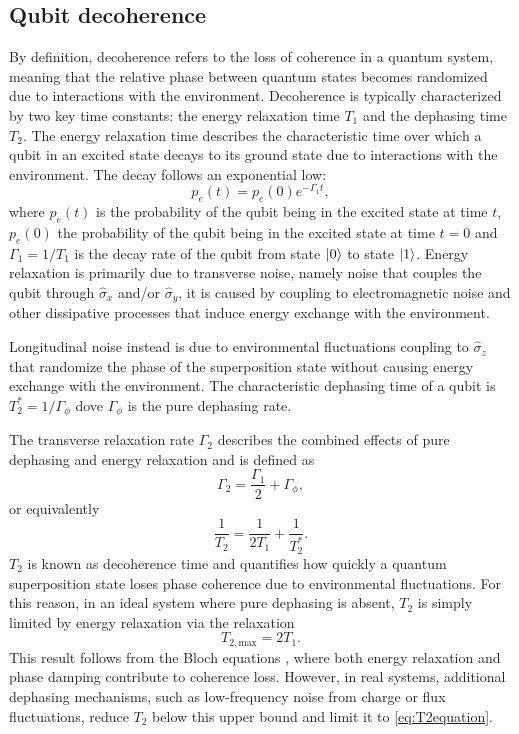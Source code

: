 \subsection{Qubit decoherence}\label{subsec:qubit_decoherence}
By definition, decoherence refers to the loss of coherence in a quantum system, meaning that the relative phase between quantum states becomes randomized due to interactions with the environment. 
Decoherence is typically characterized by two key time constants: the energy relaxation time $T_1$ and the dephasing time $T_2$. 
The energy relaxation time describes the characteristic time over which a qubit in an excited state decays to its ground state due to interactions with the environment. The decay follows an exponential low:
\begin{equation}\label{eq:gamma1}
    p_e(t) = p_e(0) e^{-\Gamma_1 t},
\end{equation}
where $p_e(t)$ is the probability of the qubit being in the excited state at time $t$, $p_e(0)$ the probability of the qubit being in the excited state at time $t=0$ and $\Gamma_1=1/T_1$ is the decay rate of the qubit from state $\ket{0}$ to state $\ket{1}$.
Energy relaxation is primarily due to transverse noise, namely noise that couples the qubit through $\hat{\sigma}_x$ and/or $\hat{\sigma}_y$, it is caused by coupling to electromagnetic noise and other dissipative processes that induce energy exchange with the environment.

Longitudinal noise instead is due to environmental fluctuations coupling to $\hat{\sigma}_z$ that randomize the phase of the superposition state without causing energy exchange with the environment.
The characteristic dephasing time of a qubit is $T_2^* = 1/\Gamma_\phi$ dove $\Gamma_\phi$ is the pure dephasing rate.

The transverse relaxation rate $\Gamma_2$ describes the combined effects of pure dephasing and energy relaxation and is defined as 
\begin{equation}\label{eq:gamma2}
    \Gamma_2 = \frac{\Gamma_1}{2} + \Gamma_\phi,
\end{equation}
or equivalently
\begin{equation}\label{eq:T2equation}
    \frac{1}{T_2} = \frac{1}{2T_1} + \frac{1}{T_2^*}.
\end{equation}
$T_2$ is known as decoherence time and quantifies how quickly a quantum superposition state loses phase coherence due to environmental fluctuations. 
For this reason, in an ideal system where pure dephasing is absent, $T_2$ is simply limited by energy relaxation via the relaxation\begin{equation}\label{eq:T2max}
    T_{2,\text{max}} = 2T_1.
\end{equation}
This result follows from the Bloch equations \cite{krantz_quantum_2019}, where both energy relaxation and phase damping contribute to coherence loss. 
However, in real systems, additional dephasing mechanisms, such as low-frequency noise from charge or flux fluctuations, reduce $T_2$ below this upper bound and limit it to \ref{eq:T2equation}.

